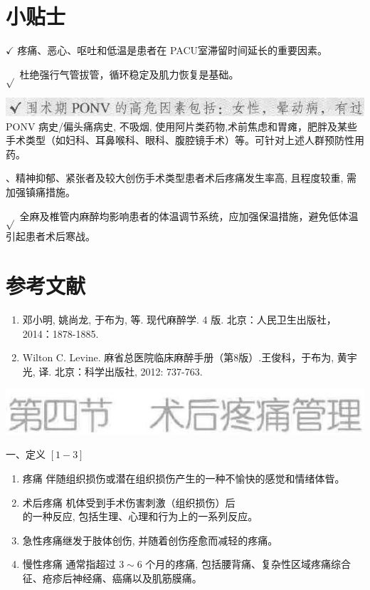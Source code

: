 \documentclass[10pt]{article}
\begin{document}
\section*{小贴士}
$\checkmark$ 疼痛、恶心、呕吐和低温是患者在 PACU室滞留时间延长的重要因素。

$\sqrt{ }$ 杜绝强行气管拔管，循环稳定及肌力恢复是基础。

\includegraphics[max width=\textwidth, center]{2024_07_05_645bb794a4d4f32ee0c8g-273(1)}\\
PONV 病史/偏头痛病史, 不吸烟, 使用阿片类药物,术前焦虑和胃瘫，肥胖及某些手术类型（如妇科、耳鼻喉科、眼科、腹腔镜手术）等。可针对上述人群预防性用药。

、精神抑郁、紧张者及较大创伤手术类型患者术后疼痛发生率高, 且程度较重, 需加强镇痛措施。

$\sqrt{ }$ 全麻及椎管内麻醉均影响患者的体温调节系统，应加强保温措施，避免低体温引起患者术后寒战。

\section*{参考文献}
\begin{enumerate}
  \item 邓小明, 姚尚龙, 于布为, 等. 现代麻醉学. 4 版. 北京：人民卫生出版社，2014：1878-1885.

  \item Wilton C. Levine. 麻省总医院临床麻醉手册（第8版）.王俊科，于布为, 黄宇光, 译. 北京：科学出版社, 2012: 737-763.

\end{enumerate}

\begin{center}
\includegraphics[max width=\textwidth]{2024_07_05_645bb794a4d4f32ee0c8g-273}
\end{center}

一、定义 $[1-3]$

\begin{enumerate}
  \item 疼痛 伴随组织损伤或潜在组织损伤产生的一种不愉快的感觉和情绪体㫮。

  \item 术后疼痛 机体受到手术伤害刺激（组织损伤）后\\
的一种反应, 包括生理、心理和行为上的一系列反应。

  \item 急性疼痛继发于肢体创伤, 并随着创伤痊愈而减轻的疼痛。

  \item 慢性疼痛 通常指超过 $3 \sim 6$ 个月的疼痛, 包括腰背痛、复杂性区域疼痛综合征、疮疹后神经痛、癌痛以及肌筋膜痛。

\end{enumerate}
\end{document}
